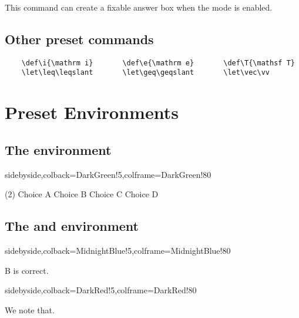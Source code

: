 \documentclass[mtpro2,twoside,openany]{litesolution}
\begin{document}
This command can create a fixable answer box when the mode  is enabled.

\subsection{Other preset commands}

\begin{verbatim}
    \def\i{\mathrm i}       \def\e{\mathrm e}       \def\T{\mathsf T}
    \let\leq\leqslant       \let\geq\geqslant       \let\vec\vv
\end{verbatim}

\section{Preset  Environments}

\subsection{The  environment}

\begin{tcblisting}{sidebyside,colback=DarkGreen!5,colframe=DarkGreen!80}
\begin{problem}[<Keywords>]\leavevmode
\begin{tasks}(2)
  \task Choice A  \task[\true] Choice B
  \task Choice C  \task Choice D
\end{tasks}
\end{problem}
\end{tcblisting}

\subsection{The  and  environment}

\begin{minipage}{.48\textwidth}
\begin{tcblisting}{sidebyside,colback=MidnightBlue!5,colframe=MidnightBlue!80}
\begin{solution}
  B is correct.
\end{solution}
\end{tcblisting}
\end{minipage}
\hfill
\begin{minipage}{.48\textwidth}
\begin{tcblisting}{sidebyside,colback=DarkRed!5,colframe=DarkRed!80}
\begin{note}
  We note that.
\end{note}
\end{tcblisting}    
\end{minipage}
\end{document}
